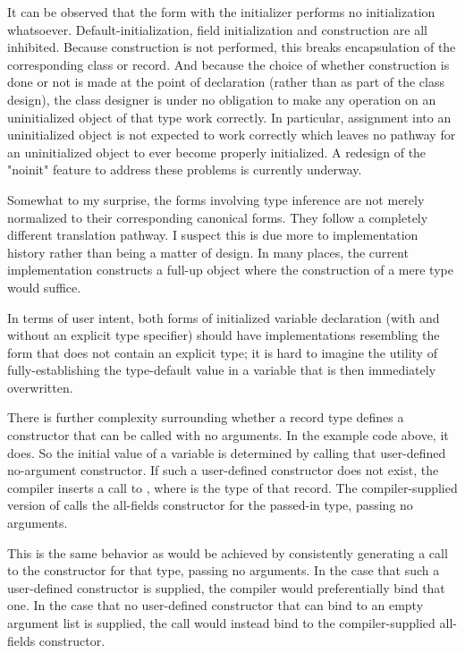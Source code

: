 It can be observed that the form with the  initializer performs no
initialization whatsoever.  Default-initialization, field initialization and construction are
all inhibited.  Because construction is not performed, this breaks encapsulation of the
corresponding class or record.  And because the choice of whether construction is done or
not is made at the point of declaration (rather than as part of the class design), the
class designer is under no obligation to make any operation on an uninitialized object of
that type work correctly.  In particular, assignment into an uninitialized object is
not expected to work correctly which leaves no pathway for an uninitialized
object to ever become properly initialized.  A redesign of the "noinit" feature to address
these problems is currently underway.

Somewhat to my surprise, the forms involving type inference are not merely normalized
to their corresponding canonical forms.  They follow a completely different translation
pathway.  I suspect this is due more to implementation history rather than being a matter
of design.  In many places, the current implementation constructs a
full-up object where the construction of a mere type would suffice.  

In terms of user intent, both forms of initialized variable declaration (with and without
an explicit type specifier) should have implementations resembling the
form that does not contain an explicit type; it is hard to imagine the utility of
fully-establishing the type-default value in a variable that is then immediately overwritten.

There is further complexity surrounding whether a record type defines a constructor that
can be called with no arguments.  In the example code above, it does.  So the initial value of
a  variable is determined by calling that user-defined no-argument
constructor.  If such a user-defined constructor does not exist, the compiler
inserts a call to , where  is the type of that record.  The
compiler-supplied version of  calls the all-fields constructor for the
passed-in type, passing no arguments.  

This is the same behavior as would be achieved by consistently generating a call to the
constructor for that type, passing no arguments.  
In the case that such a user-defined
constructor is supplied, the compiler would preferentially bind that one.
In the case that no user-defined
constructor that can bind to an empty argument list is supplied, the call would instead bind to
the compiler-supplied all-fields constructor.  

